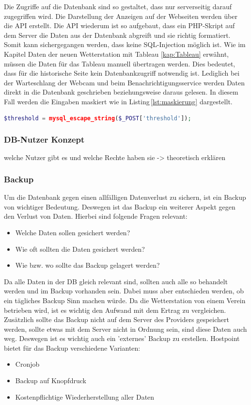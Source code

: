 Die Zugriffe auf die Datenbank sind so gestaltet, dass nur serverseitig darauf zugegriffen wird. Die Darstellung der Anzeigen auf der Webseiten werden über die API erstellt. Die API wiederum ist so aufgebaut, dass ein PHP-Skript auf dem Server die Daten aus der Datenbank abgreift und sie richtig formatiert. Somit kann sichergegangen werden, dass keine SQL-Injection möglich ist. Wie im Kapitel Daten der neuen Wetterstation mit Tableau \ref{kap:Tableau} erwähnt, müssen die Daten für das Tableau manuell übertragen werden. Dies bedeutet, dass für die historische Seite kein Datenbankzugriff notwendig ist. Lediglich bei der Warteschlang der Webcam und beim Benachrichtigungsservice werden Daten direkt in die Datenbank geschrieben beziehungsweise daraus gelesen. In diesem Fall werden die Eingaben maskiert wie in Listing\,\ref{lst:maskierung} dargestellt.

\begin{lstlisting}[label=lst:maskierung,caption=Maskierung von Datenbank-Eingaben, language=PHP, style=PHP]
$threshold = mysql_escape_string($_POST['threshold']);
\end{lstlisting}


\subsubsection{DB-Nutzer Konzept}
welche Nutzer gibt es und welche Rechte haben sie -> theoretisch erklären

\subsubsection{Backup}
Um die Datenbank gegen einen allfälligen Datenverlust zu sichern, ist ein Backup von wichtiger Bedeutung. Deswegen ist das Backup ein weiterer Aspekt gegen den Verlust von Daten. Hierbei sind folgende Fragen relevant:
\begin{itemize}
\item Welche Daten sollen gesichert werden?
\item Wie oft sollten die Daten gesichert werden?
\item Wie bzw. wo sollte das Backup gelagert werden?
\end{itemize}

Da alle Daten in der DB gleich relevant sind, sollten auch alle so behandelt werden und im Backup vorhanden sein. Dabei muss aber entschieden werden, ob ein tägliches Backup Sinn machen würde. Da die Wetterstation von einem Verein betrieben wird, ist es wichtig den Aufwand mit dem Ertrag zu vergleichen. Zusätzlich sollte das Backup nicht auf dem Server des Providers gespeichert werden, sollte etwas mit dem Server nicht in Ordnung sein, sind diese Daten auch weg. Deswegen ist es wichtig auch ein 'externes' Backup zu erstellen. Hostpoint bietet für das Backup verschiedene Varianten:
\begin{itemize}
\item Cronjob
\item Backup auf Knopfdruck
\item Kostenpflichtige Wiederherstellung aller Daten
\end{itemize}


